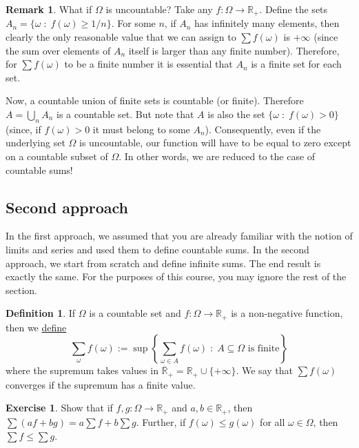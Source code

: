 \documentclass[preprint,  11pt]{amsart}
\theoremstyle{plain} %
\theoremstyle{definition} %
\newtheorem{definition}[theorem]{Definition}
\newtheorem{exercise}[theorem]{Exercise}
\newtheorem{remark}[theorem]{Remark}
\begin{document}
\begin{remark} What if $\Omega$ is uncountable? Take any $f:\Omega\rightarrow \mathbb{R}_{+}$. Define the sets $A_{n}=\{\omega{\; : \;} f(\omega)\ge 1/n\}$. For some $n$, if $A_{n}$ has infinitely many elements, then clearly the only reasonable value that we can assign to $\sum f(\omega)$ is $+\infty$ (since the sum over elements of $A_{n}$ itself is larger than any finite number). Therefore, for $\sum f(\omega)$ to be a finite number it is essential that $A_{n}$ is a finite set for each set.

Now, a countable union of finite sets is countable (or finite). Therefore $A=\bigcup_{n}A_{n}$ is a countable set. But note that $A$ is also the set $\{\omega{\; : \;} f(\omega)>0\}$ (since, if $f(\omega)>0$ it must belong to some $A_{n}$). Consequently, even if the underlying set $\Omega$ is uncountable, our function will have to be equal to zero except on a countable subset of $\Omega$. In other words, we are reduced to the case of countable sums!
\end{remark}

\subsection{Second approach} In the first approach, we assumed that you are already familiar with the notion of limits and series and used them to define countable sums. In the second approach, we start from scratch and define infinite sums. The end result is exactly the same. For the purposes of this course, you may ignore the rest of the section. 
\begin{definition} If $\Omega$ is a countable set and $f:\Omega \rightarrow \mathbb{R}_{+}$ is a non-negative function, then we \underline{define} 
$$
\sum\limits_{\omega}f(\omega) :=\sup\left\{\sum\limits_{\omega\in A}f(\omega) {\; : \;} A\subseteq \Omega \mbox{ is finite}\right\}
$$
where the supremum takes values in $\overline{\mathbb{R}}_{+}=\mathbb{R}_{+}\cup\{+\infty\}$. We say that $\sum f(\omega)$ converges if the supremum has a finite value. 
\end{definition}
\begin{exercise} Show that if $f,g:\Omega\rightarrow \mathbb{R}_{+}$ and $a,b\in \mathbb{R}_{+}$, then  $\sum (af+bg) = a\sum f +b\sum g$. Further, if $f(\omega)\le g(\omega)$ for all $\omega\in \Omega$, then $\sum f \le \sum g$.
\end{exercise}
\end{document}

